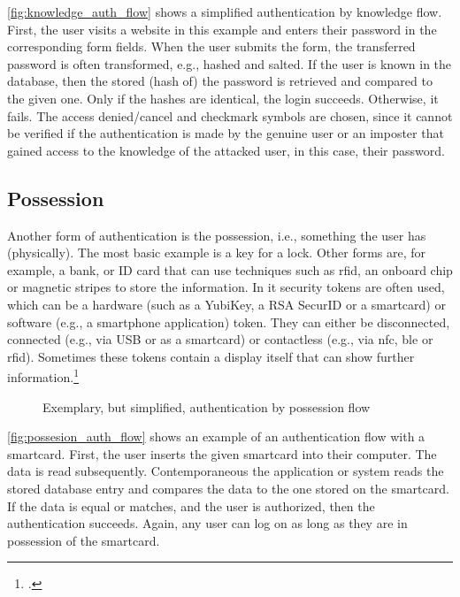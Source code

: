 \autoref{fig:knowledge_auth_flow} shows a simplified authentication by knowledge flow. First, the user visits a website in this example and enters their password in the corresponding form fields. When the user submits the form, the transferred password is often transformed, e.g., hashed and salted. If the user is known in the database, then the stored (hash of) the password is retrieved and compared to the given one. Only if the hashes are identical, the login succeeds. Otherwise, it fails. The \frqq access denied/cancel\flqq{} and \frqq checkmark\flqq{} symbols are chosen, since it cannot be verified if the authentication is made by the genuine user or an imposter that gained access to the knowledge of the attacked user, in this case, their password.

\subsection{Possession}

Another form of authentication is the possession, i.e., \frqq something the user has\flqq{} (physically). The most basic example is a key for a lock. Other forms are, for example, a bank, or ID card that can use techniques such as \gls{rfid}, an onboard chip or magnetic stripes to store the information. In \gls{it} security tokens are often used, which can be a hardware (such as a YubiKey, a RSA SecurID or a smartcard) or software (e.g., a smartphone application) token. They can either be disconnected, connected (e.g., via USB or as a smartcard) or contactless (e.g., via \gls{nfc}, \gls{ble} or \gls{rfid}). Sometimes these tokens contain a display itself that can show further information.\footcites[See][24]{265831}[][]{Dressel:2019:SZT:3319499.3328225}[See][8--11]{1698485}

\begin{figure}[hbt]
	\centering
	
	\caption[Exemplary, but simplified, authentication by possession flow]{Exemplary, but simplified, authentication by possession flow\footnotemark}
	\label{fig:possesion_auth_flow}
\end{figure}

\autoref{fig:possesion_auth_flow} shows an example of an authentication flow with a smartcard. First, the user inserts the given smartcard into their computer. The data is read subsequently. Contemporaneous the application or system reads the stored database entry and compares the data to the one stored on the smartcard. If the data is equal or matches, and the user is authorized, then the authentication succeeds. Again, any user can log on as long as they are in possession of the smartcard.

